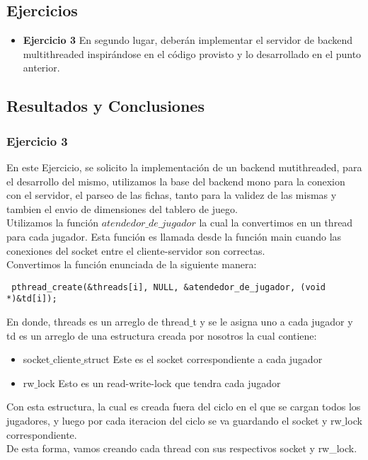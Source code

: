 
\subsection{Ejercicios}
\begin{itemize}
 \item 
\textbf{Ejercicio 3}
En segundo lugar, deberán implementar el servidor de backend multithreaded inspirándose en el código provisto y lo 
desarrollado en el punto anterior.
\end{itemize}

\subsection{Resultados y Conclusiones}


\subsubsection[Resolución Ejercicio 3]{Ejercicio 3}

\indent En este Ejercicio, se solicito la implementación de un backend mutithreaded, para el desarrollo del mismo,
utilizamos la base del backend mono para la conexion con el servidor, el parseo de las fichas, tanto para la validez de las mismas
y tambien el envio de dimensiones del tablero de juego.\\

Utilizamos la función $atendedor\_de\_jugador$ la cual la convertimos en un thread para cada jugador. Esta función es llamada desde
la función main cuando las conexiones del socket entre el cliente-servidor son correctas. \\
Convertimos la función enunciada de la siguiente manera:\\
\begin{verbatim}
 pthread_create(&threads[i], NULL, &atendedor_de_jugador, (void *)&td[i]);
\end{verbatim}

En donde, threads es un arreglo de thread$\_$t y se le asigna uno a cada jugador y td es un arreglo de una estructura creada por
nosotros la cual contiene:
\begin{itemize}
 \item socket$\_$cliente$\_$struct Este es el socket correspondiente a cada jugador
 \item rw$\_$lock Esto es un read-write-lock que tendra cada jugador
\end{itemize}

Con esta estructura, la cual es creada fuera del ciclo en el que se cargan todos los jugadores, y luego por cada iteracion 
del ciclo se va guardando el socket y rw$\_$lock correspondiente.\\
De esta forma, vamos creando cada thread con sus respectivos socket y rw\_lock.\\

